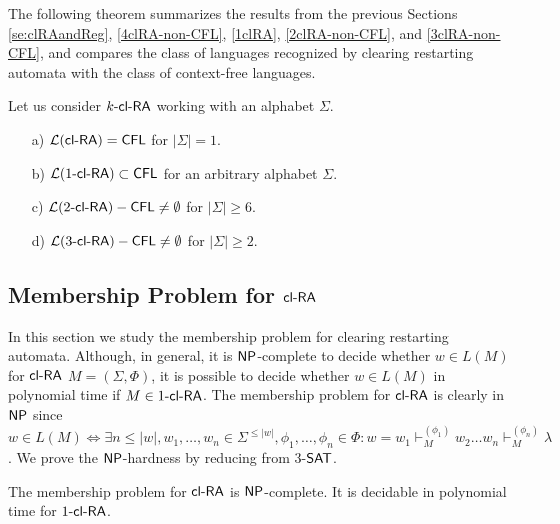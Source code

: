 The following theorem summarizes the results from the previous Sections
\ref{se:clRAandReg}, \ref{4clRA-non-CFL}, \ref{1clRA}, \ref{2clRA-non-CFL}, and \ref{3clRA-non-CFL},
and compares the class of languages recognized by clearing restarting automata
with the class of context-free languages.

\begin{theorem} Let us consider $\kclRA$ working with an alphabet $\Sigma$.
\begin{enumerate}
    \item[a)]
        $\calL{\clRA} = \CFL$ for $|\Sigma| = 1$.
    \item[b)]
        $\calL{\kclRA[1]} \subset \CFL$ for an arbitrary alphabet $\Sigma$.
    \item[c)]
        $\calL{\kclRA[2]} - \CFL \not= \emptyset$ for $|\Sigma| \ge 6$.
    \item[d)]
        $\calL{\kclRA[3]} - \CFL \not= \emptyset$ for $|\Sigma| \ge 2$.
\end{enumerate}
\end{theorem}

\subsection{Membership Problem for $\clRA$}\label{clra_membership}

In this section we study the membership problem for clearing restarting automata. Although, in general, it is $\classNP$-complete to decide whether $w \in L(M)$ for $\clRA$ $M = (\Sigma, \Phi)$, it is possible to decide whether $w \in L(M)$ in polynomial time if $M \in \kclRA[1]$. The membership problem for $\clRA$ is clearly in $\classNP$ since $w \in L(M) \Leftrightarrow \exists n \le |w|, w_1, \ldots, w_n \in \Sigma^{\le |w|}, \phi_1, \ldots, \phi_n \in \Phi: w = w_1 \vdash_M^{(\phi_1)} w_2 \ldots w_n \vdash_M^{(\phi_n)} \lambda$. We prove the $\classNP$-hardness by reducing from $3$-$\SAT$.

\begin{theorem}\label{theorem:clra_membership}
The membership problem for $\clRA$ is $\classNP$-complete. It is decidable in polynomial time for $\kclRA[1]$.
\end{theorem}

